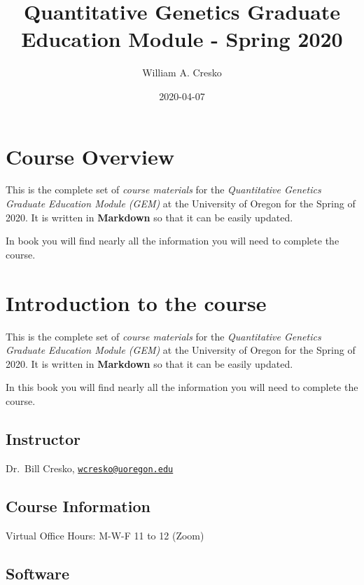 \documentclass[]{book}
\title{Quantitative Genetics Graduate Education Module - Spring 2020}
\author{William A. Cresko}
\date{2020-04-07}
\begin{document}
\maketitle

{
\setcounter{tocdepth}{1}
\tableofcontents
}
\hypertarget{course-overview}{%
\chapter{Course Overview}\label{course-overview}}

This is the complete set of \emph{course materials} for the \emph{Quantitative Genetics Graduate Education Module (GEM)} at the University of Oregon for the Spring of 2020. It is written in \textbf{Markdown} so that it can be easily updated.

In book you will find nearly all the information you will need to complete the course.

\hypertarget{introduction-to-the-course}{%
\chapter{Introduction to the course}\label{introduction-to-the-course}}

This is the complete set of \emph{course materials} for the \emph{Quantitative Genetics Graduate Education Module (GEM)} at the University of Oregon for the Spring of 2020. It is written in \textbf{Markdown} so that it can be easily updated.

In this book you will find nearly all the information you will need to complete the course.

\hypertarget{instructor}{%
\section{Instructor}\label{instructor}}

Dr.~Bill Cresko, \href{mailto:wcresko@uoregon.edu}{\nolinkurl{wcresko@uoregon.edu}}

\hypertarget{course-information}{%
\section{Course Information}\label{course-information}}

Virtual Office Hours: M-W-F 11 to 12 (Zoom)

\hypertarget{software}{%
\section{Software}\label{software}}
\end{document}
